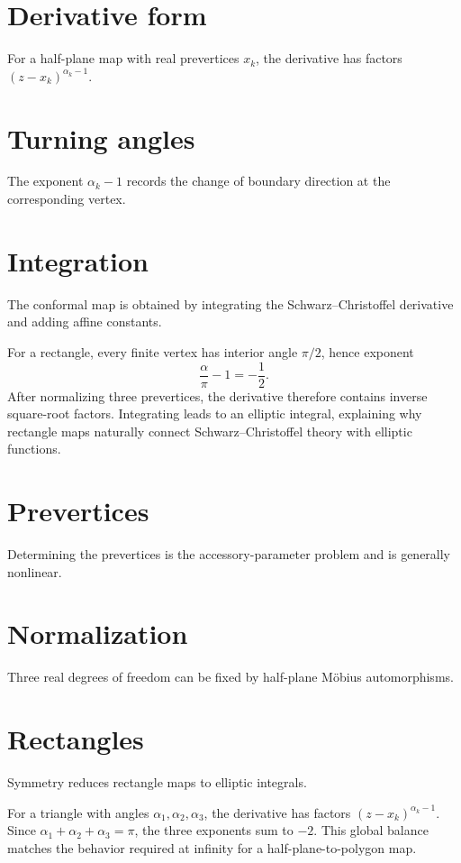 \section{Derivative form}
For a half-plane map with real prevertices $x_k$, the derivative has factors $(z-x_k)^{\alpha_k-1}$.

\section{Turning angles}
The exponent $\alpha_k-1$ records the change of boundary direction at the corresponding vertex.

\section{Integration}
The conformal map is obtained by integrating the Schwarz–Christoffel derivative and adding affine constants.

\begin{example}\label{ex:iv18-expand-02}
For a rectangle, every finite vertex has interior angle \(\pi/2\), hence exponent
\[
\frac{\alpha}{\pi}-1=-\frac12.
\]
After normalizing three prevertices, the derivative therefore contains inverse square-root factors. Integrating leads to an elliptic integral, explaining why rectangle maps naturally connect Schwarz--Christoffel theory with elliptic functions.
\end{example}
\section{Prevertices}
Determining the prevertices is the accessory-parameter problem and is generally nonlinear.

\section{Normalization}
Three real degrees of freedom can be fixed by half-plane Möbius automorphisms.

\section{Rectangles}
Symmetry reduces rectangle maps to elliptic integrals.

\begin{example}\label{ex:iv18-expand-03}
For a triangle with angles \(\alpha_1,\alpha_2,\alpha_3\), the derivative has factors \((z-x_k)^{\alpha_k-1}\). Since \(\alpha_1+\alpha_2+\alpha_3=\pi\), the three exponents sum to \(-2\). This global balance matches the behavior required at infinity for a half-plane-to-polygon map.
\end{example}
